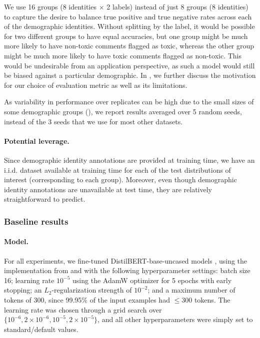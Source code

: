 We use 16 groups (8 identities $\times$ 2 labels) instead of just 8 groups (8 identities) to capture the desire to balance true positive and true negative rates across each of the demographic identities.
Without splitting by the label, it would be possible for two different groups to have equal accuracies,
but one group might be much more likely to have non-toxic comments flagged as toxic, whereas the other group might be much more likely to have toxic comments flagged as non-toxic.
This would be undesirable from an application perspective, as such a model would still be biased against a particular demographic.
In , we further discuss the motivation for our choice of evaluation metric as well as its limitations.

As variability in performance over replicates can be high due to the small sizes of some demographic groups (), we report results averaged over 5 random seeds, instead of the 3 seeds that we use for most other datasets.

\paragraph{Potential leverage.}
Since demographic identity annotations are provided at training time, we have an i.i.d. dataset available at training time for each of the test distributions of interest (corresponding to each group).
Moreover, even though demographic identity annotations are unavailable at test time,
they are relatively straightforward to predict.

\subsubsection{Baseline results}

\paragraph{Model.}
For all experiments, we fine-tuned DistilBERT-base-uncased models \citep{sanh2019distilbert}, using the implementation from \citet{wolf2019transformers} and with the following hyperparameter settings:
batch size 16; learning rate $10^{-5}$ using the AdamW optimizer \citep{loshchilov2019decoupled} for 5 epochs with early stopping; an $L_2$-regularization strength of $10^{-2}$;
and a maximum number of tokens of 300, since 99.95\% of the input examples had $\leq$300 tokens.
The learning rate was chosen through a grid search over
$\{10^{-6}, 2 \times 10^{-6}, 10^{-5}, 2 \times 10^{-5}\}$, and all other hyperparameters were simply set to standard/default values.

